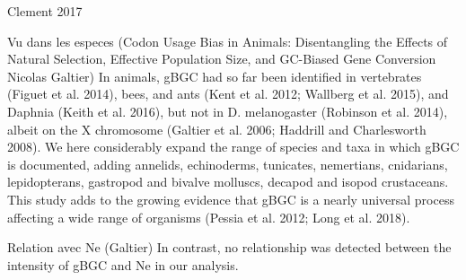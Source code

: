 Clement 2017


Vu dans les especes (Codon Usage Bias in Animals: Disentangling the Effects of Natural Selection, Effective Population Size, and GC-Biased Gene Conversion  Nicolas Galtier)
In animals, gBGC had so far been identified in vertebrates (Figuet et al. 2014), bees, and ants (Kent et al. 2012; Wallberg et al. 2015), and Daphnia (Keith et al. 2016), but not in D. melanogaster (Robinson et al. 2014), albeit on the X chromosome (Galtier et al. 2006; Haddrill and Charlesworth 2008).
We here considerably expand the range of species and taxa in which gBGC is documented, adding annelids, echinoderms, tunicates, nemertians, cnidarians, lepidopterans, gastropod and bivalve molluscs, decapod and isopod crustaceans. 
This study adds to the growing evidence that gBGC is a nearly universal process affecting a wide range of organisms (Pessia et al. 2012; Long et al. 2018).


Relation avec Ne (Galtier)
In contrast, no relationship was detected between the intensity of gBGC and Ne in our analysis. 


